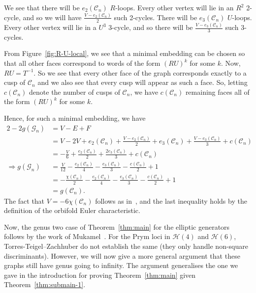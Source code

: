 \documentclass[a4paper,11pt]{amsart}
\numberwithin{equation}{section}
\numberwithin{figure}{section}
\numberwithin{table}{section}
\newcommand{\calH}{\mathcal{H}}
\begin{document}
We see that there will be $e_{2}(\mathcal{C}_{n})$ $R$-loops. Every other vertex will lie in an $R^{2}$ 2-cycle, and so we will have $\frac{V-e_{2}(\mathcal{C}_{n})}{2}$ such 2-cycles. There will be $e_{3}(\mathcal{C}_{n})$ $U$-loops. Every other vertex will lie in a $U^{3}$ 3-cycle, and so there will be $\frac{V-e_{3}(\mathcal{C}_{n})}{3}$ such 3-cycles.

From Figure~\ref{fig:R-U-local}, we see that a minimal embedding can be chosen so that all other faces correspond to words of the form $(RU)^{k}$ for some $k$. Now, $RU = T^{-1}$. So we see that every other face of the graph corresponds exactly to a cusp of $\mathcal{C}_{n}$ and we also see that every cusp will appear as such a face. So, letting $c(\mathcal{C}_{n})$ denote the number of cusps of $\mathcal{C}_{n}$, we have $c(\mathcal{C}_{n})$ remaining faces all of the form $(RU)^{k}$ for some $k$.

Hence, for such a minimal embedding, we have
\begin{align*}
    2 - 2 g(\mathcal{G}_{n}) &= V-E+F \\
    &= V - 2V + e_{2}(\mathcal{C}_{n}) + \frac{V-e_{2}(\mathcal{C}_{n})}{2} + e_{3}(\mathcal{C}_{n}) + \frac{V-e_{3}(\mathcal{C}_{n})}{3} + c(\mathcal{C}_{n}) \\
    & = -\frac{V}{6} + \frac{e_{2}(\mathcal{C}_{n})}{2} + \frac{2e_{3}(\mathcal{C}_{n})}{3} + c(\mathcal{C}_{n}) \\
    \Rightarrow g(\mathcal{G}_{n}) &= \frac{V}{12} - \frac{e_{2}(\mathcal{C}_{n})}{4} - \frac{e_{3}(\mathcal{C}_{n})}{3} - \frac{c(\mathcal{C}_{n})}{2} +1\\
    &= -\frac{\chi(\mathcal{C}_{n})}{2} - \frac{e_{2}(\mathcal{C}_{n})}{4} - \frac{e_{3}(\mathcal{C}_{n})}{3} - \frac{c(\mathcal{C}_{n})}{2} + 1 \\ 
    & = g(\mathcal{C}_{n}).
\end{align*}
The fact that $V = -6\chi(\mathcal{C}_{n})$ follows as in~\cite[Proof of Theorem 1.1]{KM}, and the last inequality holds by the definition of the orbifold Euler characteristic.

Now, the genus two case of Theorem~\ref{thm:main} for the elliptic generators follows by the work of Mukamel~\cite{Muk}. For the Prym loci in $\calH(4)$ and $\calH(6)$, Torres-Teigel--Zachhuber do not establish the same (they only handle non-square discriminants). However, we will now give a more general argument that these graphs still have genus going to infinity. The argument generalises the one we gave in the introduction for proving Theorem~\ref{thm:main} given Theorem~\ref{thm:submain-1}.
\end{document}
